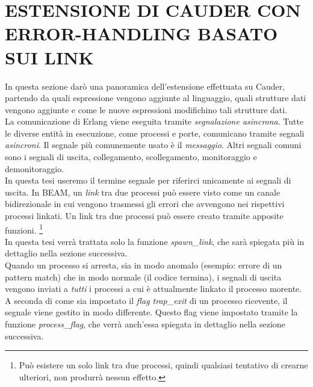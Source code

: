\documentclass[Tesi.tex]{subfiles}
\begin{document}
\section{ESTENSIONE DI CAUDER CON ERROR-HANDLING BASATO SUI LINK}
In questa sezione darò una panoramica dell'estensione effettuata su Cauder, partendo da quali espressione vengono aggiunte al linguaggio, quali strutture dati vengono aggiunte e come le nuove espressioni modifichino tali strutture dati.\\
La comunicazione di Erlang viene eseguita tramite \textit{segnalazione asincrona}. Tutte le diverse entità in esecuzione, come processi e porte, comunicano tramite segnali \textit{asincroni}\cite{erlangCommunication}.
Il segnale più comunemente usato è il \textit{messaggio}. Altri segnali comuni sono i segnali di uscita, collegamento, scollegamento, monitoraggio e demonitoraggio.\\
In questa tesi useremo il termine segnale per riferirci unicamente ai segnali di uscita.
In BEAM, un \textit{link} \cite{erlangLinks} tra due processi può essere visto come un canale bidirezionale in cui vengono trasmessi gli errori che avvengono nei rispettivi processi linkati.
Un link tra due processi può essere creato tramite apposite funzioni.
\footnote{Può esistere un solo link tra due processi, quindi qualsiasi tentativo di crearne ulteriori, non produrrà nessun effetto.}\\
In questa tesi verrà trattata solo la funzione \textit{spawn\_link}, che sarà spiegata più in dettaglio nella sezione successiva.\\
Quando un processo si arresta, sia in modo anomalo (esempio: errore di un pattern match) che in modo normale (il codice termina), i segnali di uscita vengono inviati a \textit{tutti} i processi a cui è attualmente linkato il processo morente.
A seconda di come sia impostato il \textit{flag trap\_exit} di un processo ricevente, il segnale viene gestito in modo differente. Questo flag viene impostato tramite la funzione \textit{process\_flag}, che verrà anch'essa spiegata in dettaglio nella sezione successiva.

\end{document}
